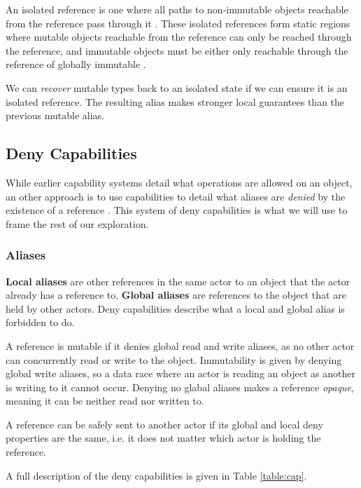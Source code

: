 An isolated reference is one where all paths to non-immutable objects reachable from the reference pass through it \cite{Gordon2012}. These isolated references form static regions where mutable objects reachable from the reference can only be reached through the reference, and immutable objects must be either only reachable through the reference of globally immutable \cite{Clebsch2015}.

We can \textit{recover} mutable types back to an isolated state if we can ensure it is an isolated reference. The resulting alias makes stronger local guarantees than the previous mutable alias.

\subsection{Deny Capabilities}

While earlier capability systems \cite{Srinivasana, Gordon2012, Boyland2001} detail what operations are allowed on an object, an other approach is to use capabilities to detail what aliases are \textit{denied} by the existence of a reference \cite{Clebsch2015}. This system of deny capabilities is what we will use to frame the rest of our exploration.

\subsubsection{Aliases}

\textbf{Local aliases} are other references in the same actor to an object that the actor already has a reference to. \textbf{Global aliases} are references to the object that are held by other actors. Deny capabilities describe what a local and global alias is forbidden to do.

A reference is mutable if it denies global read and write aliases, as no other actor can concurrently read or write to the object. Immutability is given by denying global write aliases, so a data race where an actor is reading an object as another is writing to it cannot occur. Denying no glabal aliases makes a reference \textit{opaque}, meaning it can be neither read nor written to.

A reference can be safely sent to another actor if its global and local deny properties are the same, i.e. it does not matter which actor is holding the reference.

A full description of the deny capabilities is given in Table \ref{table:cap}.

